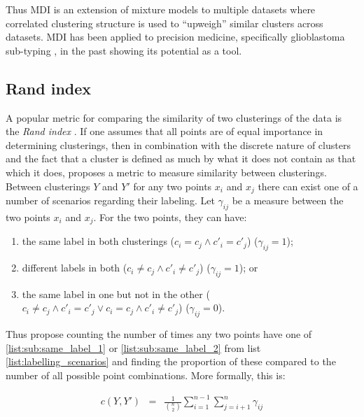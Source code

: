 \documentclass[12pt]{article} %
\begin{document}
	Thus MDI is an extension of mixture models to multiple datasets where correlated clustering structure is used to ``upweigh'' similar clusters across datasets. MDI has been applied to precision medicine, specifically glioblastoma sub-typing \cite{SavageIdentifyingcancersubtypes2013a}, in the past showing its potential as a tool.
	
	\subsection{Rand index}
	A popular metric for comparing the similarity of two clusterings of the data is the \emph{Rand index} \cite{RandObjectiveCriteriaEvaluation1971}. 	If one assumes that all points are of equal importance in determining clusterings, then in combination with the discrete nature of clusters and the fact that a cluster is defined as much by what it does not contain as that which it does, \citet{RandObjectiveCriteriaEvaluation1971} proposes a metric to measure similarity between clusterings. Between clusterings $Y$ and $Y'$ for any two points $x_i$ and $x_j$ there can exist one of a number of scenarios regarding their labeling. Let $\gamma_{ij}$ be a measure between the two points $x_i$ and $x_j$. For the two points, they can have:
	\begin{enumerate} \label{list:labelling_scenarios}
	\item the same label in both clusterings ($c_i = c_j \land c'_i = c'_j$) ($\gamma_{ij}=1$); \label{list:sub:same_label_1}
	\item different labels in both ($c_i \neq c_j \land c'_i \neq c'_j$) ($\gamma_{ij}=1$); or \label{list:sub:same_label_2}
	\item the same label in one but not in the other ($c_i \neq c_j \land c'_i = c'_j \lor c_i = c_j \land c'_i \neq c'_j$) ($\gamma_{ij}=0$). \label{list:sub:different_label}
	\end{enumerate}
	Thus \citet{RandObjectiveCriteriaEvaluation1971} propose counting the number of times any two points have one of \ref{list:sub:same_label_1} or \ref{list:sub:same_label_2} from list \ref{list:labelling_scenarios} and finding the proportion of these compared to the number of all possible point combinations. More formally, this is:
	
	\begin{eqnarray} \label{eqn:rand_index}
	c(Y, Y') & = & \frac{1}{\binom{n}{2} } \sum_{i=1}^{n-1}\sum_{j=i + 1}^n\gamma_{ij} 
	\end{eqnarray}
	
\end{document}
